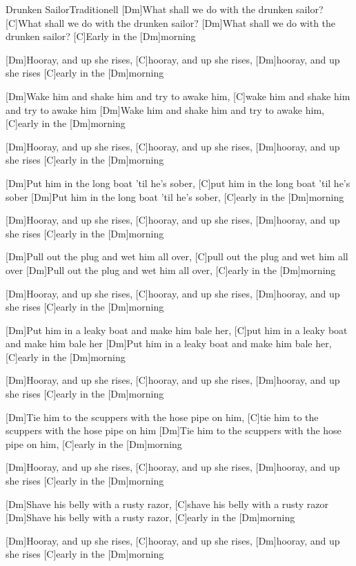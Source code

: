 \documentclass[../main.tex]{subfiles}
\begin{document}
\begin{song}{Drunken Sailor}{Traditionell}{}
[Dm]What shall we do with the drunken sailor? [C]What shall we do with the drunken sailor?
[Dm]What shall we do with the drunken sailor? [C]Early in the [Dm]morning

[Dm]Hooray, and up she rises, [C]hooray, and up she rises, [Dm]hooray, and up she rises [C]early in the [Dm]morning

[Dm]Wake him and shake him and try to awake him, [C]wake him and shake him and try to awake him
[Dm]Wake him and shake him and try to awake him, [C]early in the [Dm]morning

[Dm]Hooray, and up she rises, [C]hooray, and up she rises, [Dm]hooray, and up she rises [C]early in the [Dm]morning

[Dm]Put him in the long boat 'til he's sober, [C]put him in the long boat 'til he's sober
[Dm]Put him in the long boat 'til he's sober, [C]early in the [Dm]morning

[Dm]Hooray, and up she rises, [C]hooray, and up she rises, [Dm]hooray, and up she rises [C]early in the [Dm]morning

[Dm]Pull out the plug and wet him all over, [C]pull out the plug and wet him all over
[Dm]Pull out the plug and wet him all over, [C]early in the [Dm]morning

[Dm]Hooray, and up she rises, [C]hooray, and up she rises, [Dm]hooray, and up she rises [C]early in the [Dm]morning

[Dm]Put him in a leaky boat and make him bale her, [C]put him in a leaky boat and make him bale her
[Dm]Put him in a leaky boat and make him bale her, [C]early in the [Dm]morning

[Dm]Hooray, and up she rises, [C]hooray, and up she rises, [Dm]hooray, and up she rises [C]early in the [Dm]morning

[Dm]Tie him to the scuppers with the hose pipe on him, [C]tie him to the scuppers with the hose pipe on him
[Dm]Tie him to the scuppers with the hose pipe on him, [C]early in the [Dm]morning

[Dm]Hooray, and up she rises, [C]hooray, and up she rises, [Dm]hooray, and up she rises [C]early in the [Dm]morning

[Dm]Shave his belly with a rusty razor, [C]shave his belly with a rusty razor
[Dm]Shave his belly with a rusty razor, [C]early in the [Dm]morning

[Dm]Hooray, and up she rises, [C]hooray, and up she rises, [Dm]hooray, and up she rises [C]early in the [Dm]morning


\end{song}
\end{document}
